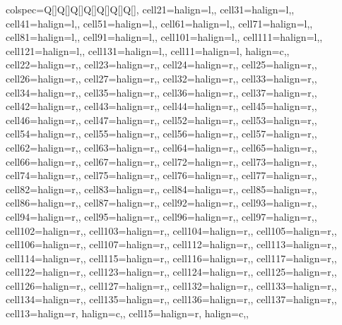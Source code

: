 \documentclass[
  letterpaper,
  DIV=11,
  numbers=noendperiod]{scrreprt}
\begin{document}
\begin{table}
\centering
\begin{tblr}[         %
]                     %
{                     %
colspec={Q[]Q[]Q[]Q[]Q[]Q[]Q[]},
cell{2}{1}={}{halign=l,},
cell{3}{1}={}{halign=l,},
cell{4}{1}={}{halign=l,},
cell{5}{1}={}{halign=l,},
cell{6}{1}={}{halign=l,},
cell{7}{1}={}{halign=l,},
cell{8}{1}={}{halign=l,},
cell{9}{1}={}{halign=l,},
cell{10}{1}={}{halign=l,},
cell{11}{1}={}{halign=l,},
cell{12}{1}={}{halign=l,},
cell{13}{1}={}{halign=l,},
cell{1}{1}={}{halign=l, halign=c,},
cell{2}{2}={}{halign=r,},
cell{2}{3}={}{halign=r,},
cell{2}{4}={}{halign=r,},
cell{2}{5}={}{halign=r,},
cell{2}{6}={}{halign=r,},
cell{2}{7}={}{halign=r,},
cell{3}{2}={}{halign=r,},
cell{3}{3}={}{halign=r,},
cell{3}{4}={}{halign=r,},
cell{3}{5}={}{halign=r,},
cell{3}{6}={}{halign=r,},
cell{3}{7}={}{halign=r,},
cell{4}{2}={}{halign=r,},
cell{4}{3}={}{halign=r,},
cell{4}{4}={}{halign=r,},
cell{4}{5}={}{halign=r,},
cell{4}{6}={}{halign=r,},
cell{4}{7}={}{halign=r,},
cell{5}{2}={}{halign=r,},
cell{5}{3}={}{halign=r,},
cell{5}{4}={}{halign=r,},
cell{5}{5}={}{halign=r,},
cell{5}{6}={}{halign=r,},
cell{5}{7}={}{halign=r,},
cell{6}{2}={}{halign=r,},
cell{6}{3}={}{halign=r,},
cell{6}{4}={}{halign=r,},
cell{6}{5}={}{halign=r,},
cell{6}{6}={}{halign=r,},
cell{6}{7}={}{halign=r,},
cell{7}{2}={}{halign=r,},
cell{7}{3}={}{halign=r,},
cell{7}{4}={}{halign=r,},
cell{7}{5}={}{halign=r,},
cell{7}{6}={}{halign=r,},
cell{7}{7}={}{halign=r,},
cell{8}{2}={}{halign=r,},
cell{8}{3}={}{halign=r,},
cell{8}{4}={}{halign=r,},
cell{8}{5}={}{halign=r,},
cell{8}{6}={}{halign=r,},
cell{8}{7}={}{halign=r,},
cell{9}{2}={}{halign=r,},
cell{9}{3}={}{halign=r,},
cell{9}{4}={}{halign=r,},
cell{9}{5}={}{halign=r,},
cell{9}{6}={}{halign=r,},
cell{9}{7}={}{halign=r,},
cell{10}{2}={}{halign=r,},
cell{10}{3}={}{halign=r,},
cell{10}{4}={}{halign=r,},
cell{10}{5}={}{halign=r,},
cell{10}{6}={}{halign=r,},
cell{10}{7}={}{halign=r,},
cell{11}{2}={}{halign=r,},
cell{11}{3}={}{halign=r,},
cell{11}{4}={}{halign=r,},
cell{11}{5}={}{halign=r,},
cell{11}{6}={}{halign=r,},
cell{11}{7}={}{halign=r,},
cell{12}{2}={}{halign=r,},
cell{12}{3}={}{halign=r,},
cell{12}{4}={}{halign=r,},
cell{12}{5}={}{halign=r,},
cell{12}{6}={}{halign=r,},
cell{12}{7}={}{halign=r,},
cell{13}{2}={}{halign=r,},
cell{13}{3}={}{halign=r,},
cell{13}{4}={}{halign=r,},
cell{13}{5}={}{halign=r,},
cell{13}{6}={}{halign=r,},
cell{13}{7}={}{halign=r,},
cell{1}{3}={}{halign=r, halign=c,},
cell{1}{5}={}{halign=r, halign=c,},
}
\end{tblr}
\end{table}
\end{document}
